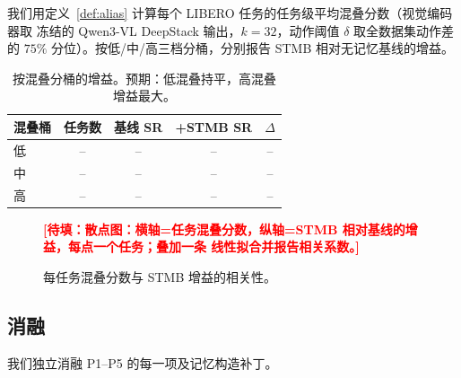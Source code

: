 \documentclass[11pt]{ctexart}
\newcommand{\todo}[1]{\textcolor{red}{\textbf{[待填：#1]}}}
\newcommand{\num}{--}
\begin{document}
我们用定义~\ref{def:alias} 计算每个 LIBERO 任务的任务级平均混叠分数（视觉编码器取
冻结的 Qwen3-VL DeepStack 输出，$k{=}32$，动作阈值 $\delta$ 取全数据集动作差的
$75\%$ 分位）。按低/中/高三档分桶，分别报告 STMB 相对无记忆基线的增益。

\begin{table}[h]
\centering
\caption{按混叠分桶的增益。预期：低混叠持平，高混叠增益最大。}
\label{tab:alias-bucket}
\small
\begin{tabular}{lcccc}
\toprule
混叠桶 & 任务数 & 基线 SR & +STMB SR & $\Delta$ \\
\midrule
低    & \num & \num & \num & \num \\
中    & \num & \num & \num & \num \\
高    & \num & \num & \num & \num \\
\bottomrule
\end{tabular}
\end{table}

\begin{figure}[h]
\centering
\todo{散点图：横轴=任务混叠分数，纵轴=STMB 相对基线的增益，每点一个任务；叠加一条
线性拟合并报告相关系数。}
\caption{每任务混叠分数与 STMB 增益的相关性。}
\label{fig:alias-scatter}
\end{figure}

\subsection{消融}
\label{sec:exp-ablation}

我们独立消融 P1–P5 的每一项及记忆构造补丁。
\end{document}
